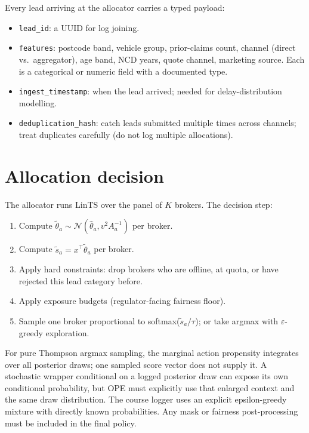 \documentclass[11pt,oneside]{scrbook}
\begin{document}
Every lead arriving at the allocator carries a typed payload:
\begin{itemize}\setlength\itemsep{0pt}
  \item \texttt{lead\_id}: a UUID for log joining.
  \item \texttt{features}: postcode band, vehicle group, prior-claims
        count, channel (direct vs.\ aggregator), age band, NCD years,
        quote channel, marketing source. Each is a categorical or
        numeric field with a documented type.
  \item \texttt{ingest\_timestamp}: when the lead arrived; needed for
        delay-distribution modelling.
  \item \texttt{deduplication\_hash}: catch leads submitted multiple times
        across channels; treat duplicates carefully (do not log multiple
        allocations).
\end{itemize}

\section{Allocation decision}

The allocator runs LinTS over the panel of $K$ brokers. The decision step:
\begin{enumerate}\setlength\itemsep{0pt}
  \item Compute $\tilde\theta_a \sim \mathcal{N}(\hat\theta_a, v^2 A_a^{-1})$
        per broker.
  \item Compute $\tilde s_a = x^\top \tilde\theta_a$ per broker.
  \item Apply hard constraints: drop brokers who are offline, at quota,
        or have rejected this lead category before.
  \item Apply exposure budgets (regulator-facing fairness floor).
  \item Sample one broker proportional to softmax($\tilde s_a / \tau$);
        or take argmax with $\varepsilon$-greedy exploration.
\end{enumerate}

For pure Thompson argmax sampling, the marginal action propensity
integrates over all posterior draws; one sampled score vector does not
supply it. A stochastic wrapper conditional on a logged posterior draw
can expose its own conditional probability, but OPE must explicitly use
that enlarged context and the same draw distribution. The course logger
uses an explicit epsilon-greedy mixture with directly known probabilities.
Any mask or fairness post-processing must be included in the final policy.
\end{document}
